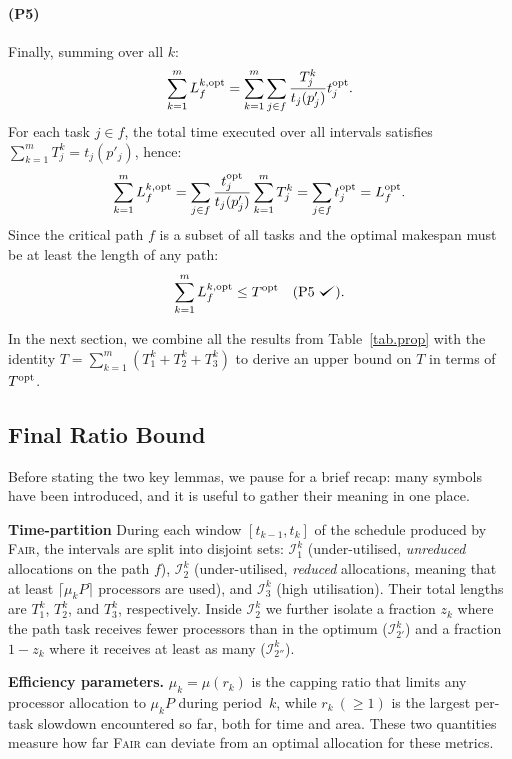 \documentclass{article}
\def\checkmark{\tikz\fill[scale=0.4](0,.35) -- (.25,0) -- (1,.7) -- (.25,.15) -- cycle;}
\newcommand\fair{\textsc{Fair}\xspace}
\newcommand\rratio{r\xspace}
\newcommand\opt{\textnormal{opt}\xspace}
\begin{document}
\paragraph{(P5)} Finally, summing over all $k$:
\[
\sum_{k=1}^m L_f^{k,\opt} = \sum_{k=1}^m \sum_{j \in f} \frac{T_j^k}{t_j(p'_j)} t_j^{\opt}.
\]
For each task $j \in f$, the total time executed over all intervals satisfies $\sum_{k=1}^m T_j^k = t_j(p'_j)$, hence:
\[
\sum_{k=1}^m L_f^{k,\opt} = \sum_{j \in f} \frac{t_j^{\opt}}{t_j(p'_j)} \sum_{k=1}^m T_j^k = \sum_{j \in f} t_j^{\opt} = L_f^{\opt}.
\]
Since the critical path $f$ is a subset of all tasks and the optimal makespan must be at least the length of any path:
\[
\sum_{k=1}^m L_f^{k,\opt} \le T^{\opt} \quad \text{(P5 \checkmark)}.
\]


In the next section, we combine all the results from Table~\ref{tab.prop} with the identity \( T = \sum_{k=1}^m (T_1^k + T_2^k + T_3^k) \) to derive an upper bound on \( T \) in terms of \( T^{\opt} \).

\subsection{Final Ratio Bound}
Before stating the two key lemmas, we pause for a brief recap: many symbols
have been introduced, and it is useful to gather their meaning in one place.

\medskip\noindent
\textbf{Time-partition}  
During each window $[t_{k-1},t_k]$ of the schedule produced by \fair, the
intervals are split into disjoint sets:
$\mathcal{I}_1^k$ (under-utilised, \emph{unreduced} allocations on the path
$f$), $\mathcal{I}_2^k$ (under-utilised, \emph{reduced} allocations, meaning that at least $\lceil \mu_k P \rceil$ processors are used), and
$\mathcal{I}_3^k$ (high utilisation).  
Their total lengths are $T_1^k$, $T_2^k$, and $T_3^k$, respectively.
Inside $\mathcal{I}_2^k$ we further isolate a fraction
$z_k$ where the path task receives fewer processors than in the optimum
($\mathcal{I}_{2'}^k$) and a fraction $1-z_k$ where it receives at least as
many ($\mathcal{I}_{2''}^k$).

\smallskip\noindent
\textbf{Efficiency parameters.}  
$\mu_k=\mu(\rratio_k)$ is the capping ratio that limits any processor
allocation to $\mu_kP$ during period~$k$, while
$\rratio_k\!\ (\ge1)$ is the largest per-task slowdown encountered so
far, both for time and area.  These two quantities measure how far \fair can deviate from an optimal
allocation for these metrics.
\end{document}
